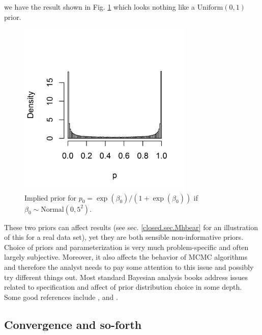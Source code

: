 we have the result shown in Fig. \ref{glms.fig.impliedprior}
which looks nothing like a $\mbox{Uniform}(0,1)$ prior.
\begin{figure}[htp]
\begin{center}
\includegraphics[height=3.3in]{Ch2-Bayes/figs/implied_prior}
\end{center}
\caption{Implied prior for $p_{0} = \exp(\beta_0)/(1+\exp(\beta_0))$ 
if $\beta_0 \sim \mbox{Normal}(0, 5^2)$.}
\label{glms.fig.impliedprior}
\end{figure}
These two priors can
affect results (see sec. \ref{closed.sec.Mhbear} for an illustration
of this for a real data set), yet they are both 
sensible
non-informative priors. Choice of priors and parameterization is
very much problem-specific and often largely subjective. Moreover, it
also affects the behavior of MCMC algorithms and therefore the analyst
needs to pay some attention to this issue and possibly try different
things out.
Most standard Bayesian analysis books address issues related to specification and
affect of prior distribution choice in some depth. Some good references include 
\citet{kass_wasserman:1996}, \citet{gelman:2006} and \citet{link_barker:2010}.


\subsection{Convergence and so-forth}
\label{glms.sec.convergence}

